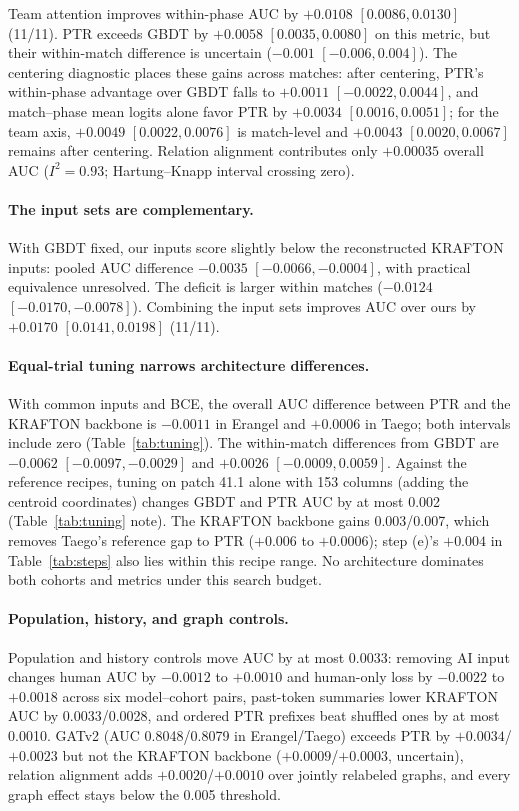 \documentclass[sigconf,anonymous,nonacm]{acmart}
\begin{document}
Team attention improves within-phase AUC by $+0.0108$ $[0.0086,\allowbreak 0.0130]$ (11/11). PTR exceeds GBDT by $+0.0058$ $[0.0035,\allowbreak 0.0080]$ on this metric, but their within-match difference is uncertain ($-0.001$ $[-0.006,\allowbreak 0.004]$). The centering diagnostic places these gains across matches: after centering, PTR's within-phase advantage over GBDT falls to $+0.0011$ $[-0.0022,\allowbreak 0.0044]$, and match--phase mean logits alone favor PTR by $+0.0034$ $[0.0016,\allowbreak 0.0051]$; for the team axis, $+0.0049$ $[0.0022,\allowbreak 0.0076]$ is match-level and $+0.0043$ $[0.0020,\allowbreak 0.0067]$ remains after centering. Relation alignment contributes only $+0.00035$ overall AUC ($I^2=0.93$; Hartung--Knapp interval crossing zero).

\paragraph{The input sets are complementary.}
With GBDT fixed, our inputs score slightly below the reconstructed KRAFTON inputs: pooled AUC difference $-0.0035$ $[-0.0066,\allowbreak -0.0004]$, with practical equivalence unresolved. The deficit is larger within matches ($-0.0124$ $[-0.0170,\allowbreak -0.0078]$). Combining the input sets improves AUC over ours by $+0.0170$ $[0.0141,\allowbreak 0.0198]$ (11/11).

\paragraph{Equal-trial tuning narrows architecture differences.}
With common inputs and BCE, the overall AUC difference between PTR and the KRAFTON backbone is $-0.0011$ in Erangel and $+0.0006$ in Taego; both intervals include zero (Table~\ref{tab:tuning}). The within-match differences from GBDT are $-0.0062$ $[-0.0097,\allowbreak -0.0029]$ and $+0.0026$ $[-0.0009,\allowbreak 0.0059]$. Against the reference recipes, tuning on patch 41.1 alone with 153 columns (adding the centroid coordinates) changes GBDT and PTR AUC by at most 0.002 (Table~\ref{tab:tuning} note). The KRAFTON backbone gains 0.003/0.007, which removes Taego's reference gap to PTR ($+0.006$ to $+0.0006$); step (e)'s $+0.004$ in Table~\ref{tab:steps} also lies within this recipe range. No architecture dominates both cohorts and metrics under this search budget.


\paragraph{Population, history, and graph controls.}
Population and history controls move AUC by at most 0.0033: removing AI input changes human AUC by $-0.0012$ to $+0.0010$ and human-only loss by $-0.0022$ to $+0.0018$ across six model--cohort pairs, past-token summaries lower KRAFTON AUC by 0.0033/0.0028, and ordered PTR prefixes beat shuffled ones by at most 0.0010. GATv2 (AUC 0.8048/0.8079 in Erangel/Taego) exceeds PTR by $+0.0034$/$+0.0023$ but not the KRAFTON backbone ($+0.0009$/$+0.0003$, uncertain), relation alignment adds $+0.0020$/$+0.0010$ over jointly relabeled graphs, and every graph effect stays below the 0.005 threshold.
\end{document}
